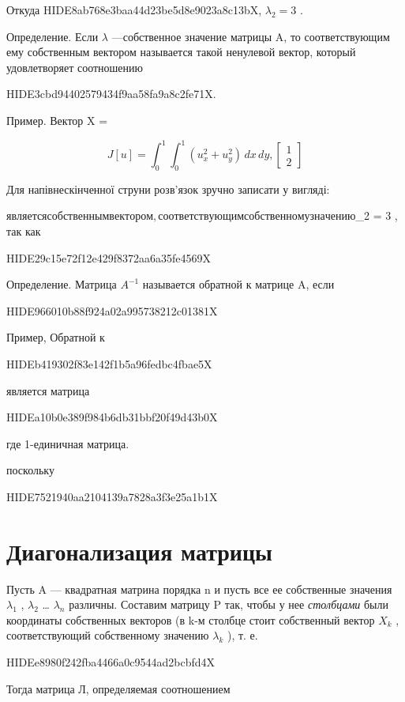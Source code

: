 \documentclass[
  ukrainian,
]{article}
\begin{document}
Откуда HIDE8ab768e3baa44d23be5d8e9023a8c13bX, \(\lambda_2 = 3\) .

Определение. Если \(\lambda\) ---собственное значение матрицы A, то
соответствующим ему собственным вектором называется такой ненулевой
вектор, который удовлетворяет соотношению

HIDE3cbd94402579434f9aa58fa9a8c2fe71X.

Пример. Вектор X =

\[
J[u] = \int_{0}^{1} \int_{0}^{1} (u_{x}^{2} + u_{y}^{2})\,dx\,dy,
\begin{bmatrix} 1 \\ 2 \end{bmatrix}
\]

Для напівнескінченної струни розв'язок зручно записати у вигляді:

\(является собственным вектором, соответствующим собственному значению\)\lambda\_2
= 3 , так как

HIDE29c15e72f12e429f8372aa6a35fe4569X

Определение. Матрица \(A^{-1}\) называется обратной к матрице A, если

HIDE966010b88f924a02a995738212c01381X

Пример, Обратной к

HIDEb419302f83e142f1b5a96fedbc4fbae5X

является матрица

HIDEa10b0e389f984b6db31bbf20f49d43b0X

где 1-единичная матрица.

поскольку

HIDE7521940aa2104139a7828a3f3e25a1b1X

\section{Диагонализация
матрицы}\label{ux434ux438ux430ux433ux43eux43dux430ux43bux438ux437ux430ux446ux438ux44f-ux43cux430ux442ux440ux438ux446ux44b}

Пусть A --- квадратная матрина порядка n и пусть все ее собственные
значения \(\lambda_1\) , \(\lambda_2\) \ldots{} \(\lambda_n\) различны.
Составим матрицу P так, чтобы у нее \emph{столбцами} были координаты
собственных векторов (в k-м столбце стоит собственный вектор \(X_k\) ,
соответствующий собственному значению \(\lambda_k\) ), т. е.

HIDEe8980f242fba4466a0c9544ad2bcbfd4X

Тогда матрица Л, определяемая соотношением
\end{document}
